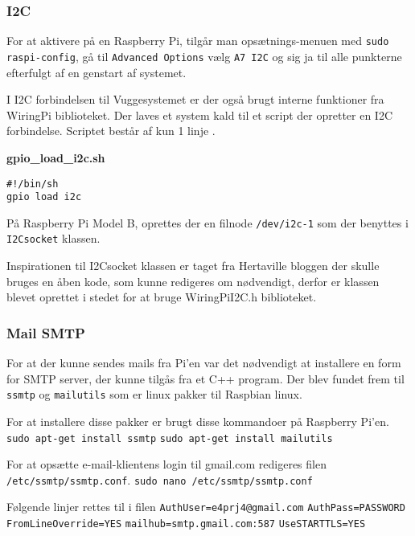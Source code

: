 \subsubsection*{I2C}

For at aktivere \iic på en Raspberry Pi, tilgår man opsætnings-menuen med \verb+sudo raspi-config+, gå til \verb+Advanced Options+ vælg \verb+A7 I2C+ og sig ja til alle punkterne efterfulgt af en genstart af systemet.

I I2C forbindelsen til Vuggesystemet er der også brugt interne funktioner fra WiringPi biblioteket. Der laves et system kald til et script der opretter en I2C forbindelse. Scriptet består af kun 1 linje .

\textbf{gpio\_load\_i2c.sh}
\begin{lstlisting}
#!/bin/sh
gpio load i2c
\end{lstlisting}

På Raspberry Pi Model B, oprettes der en filnode \verb+/dev/i2c-1+ som der benyttes i \verb+I2Csocket+ klassen.

Inspirationen til I2Csocket klassen er taget fra Hertaville bloggen \citep{website:ic2lib} der skulle bruges en åben kode, som kunne redigeres om nødvendigt, derfor er klassen blevet oprettet i stedet for at bruge WiringPiI2C.h biblioteket.

\subsubsection*{Mail SMTP}

For at der kunne sendes mails fra Pi'en var det nødvendigt at installere en form for SMTP server, der kunne tilgås fra et C++ program. Der blev fundet frem til \verb+ssmtp+ og \verb+mailutils+ \citep{website:ssmtpmailutils} som er linux pakker til Raspbian linux.

For at installere disse pakker er brugt disse kommandoer på Raspberry Pi'en. \newline
\verb+sudo apt-get install ssmtp+ \newline
\verb+sudo apt-get install mailutils+

For at opsætte e-mail-klientens login til gmail.com redigeres filen \verb+/etc/ssmtp/ssmtp.conf+. \newline
\verb+sudo nano /etc/ssmtp/ssmtp.conf+

Følgende linjer rettes til i filen\newline
\verb+AuthUser=e4prj4@gmail.com+ \newline
\verb+AuthPass=PASSWORD+ \newline
\verb+FromLineOverride=YES+ \newline
\verb+mailhub=smtp.gmail.com:587+ \newline
\verb+UseSTARTTLS=YES+

